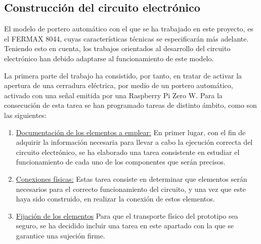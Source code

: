 \subsection{Construcción del circuito electrónico} 
El modelo de portero automático con el que se ha trabajado en este proyecto, es el FERMAX 8044, cuyas características técnicas se especificarán más adelante. Teniendo esto en cuenta, los trabajos orientados al desarrollo del circuito electrónico han debido adaptarse al funcionamiento de este modelo.

La primera parte del trabajo ha consistido, por tanto, en tratar de activar la apertura de una cerradura eléctrica, por medio de un portero automático, activado con una señal emitida por una Raspberry Pi Zero W. Para la consecución de esta tarea se han programado tareas de distinto ámbito, como son las siguientes:
\begin{enumerate}
\item \underline{Documentación de los elementos a emplear:} En primer lugar, con el fin de adquirir la información necesaria para llevar a cabo la ejecución correcta del circuito electrónico, se ha elaborado una tarea consistente en estudiar el funcionamiento de cada uno de los componentes que serán precisos.
\item \underline{Conexiones físicas:} Estas tarea consiste en determinar que elementos serán necesarios para el correcto funcionamiento del circuito, y una vez que este haya sido construido, en realizar la conexión de estos elementos.
\item \underline{Fijación de los elementos} Para que el transporte físico del prototipo sea seguro, se ha decidido incluir una tarea en este apartado con la que se garantice una sujeción firme.
\end{enumerate}
